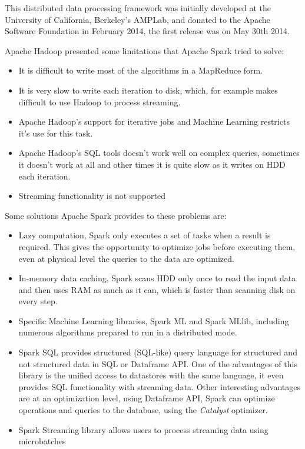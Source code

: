 \documentclass[11pt]{article} %
\begin{document}
    This distributed data processing framework was initially developed at the University of California, Berkeley's AMPLab, and donated to the Apache Software Foundation in February 2014, the first release was on May 30th 2014.

    Apache Hadoop presented some limitations that Apache Spark tried to solve:

    \begin{itemize}
      \item It is difficult to write most of the algorithms in a MapReduce form.
      \item It is very slow to write each iteration to disk, which, for example makes difficult to use Hadoop to process streaming.
      \item Apache Hadoop's support for iterative jobs and Machine Learning restricts it's use for this task.
      \item Apache Hadoop's SQL tools doesn't work well on complex queries, sometimes it doesn't work at all and other times it is quite slow as it writes on HDD each iteration.
      \item Streaming functionality is not supported
    \end{itemize}

    Some solutions Apache Spark provides to these problems are:

    \begin{itemize}
      \item Lazy computation, Spark only executes a set of tasks when a result is required. This gives the opportunity to optimize jobs before executing them, even at physical level the queries to the data are optimized.
      \item In-memory data caching, Spark scans HDD only once to read the input data and then uses RAM as much as it can, which is faster than scanning disk on every step.
      \item Specific Machine Learning libraries, Spark ML and Spark MLlib, including numerous algorithms prepared to run in a distributed mode.
      \item Spark SQL provides structured (SQL-like) query language for structured and not structured data in SQL or Dataframe API. One of the advantages of this library is the unified access to datastores with the same language, it even provides SQL functionality with streaming data. Other interesting advantages are at an optimization level, using Dataframe API, Spark can optimize operations and queries to the database, using the \emph{Catalyst} optimizer.
      \item Spark Streaming library allows users to process streaming data using microbatches
    \end{itemize}
\end{document}
